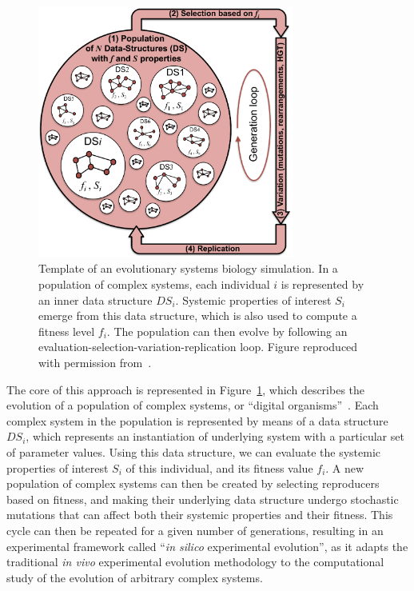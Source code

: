 \begin{figure}
\centering
\includegraphics[width=0.75\textwidth]{background/img/evol_sys_bio.pdf}
\caption[Template of an evolutionary systems biology simulation]{Template of an evolutionary systems biology simulation.
In a population of complex systems, each individual $i$ is represented by an inner data structure $DS_i$.
Systemic properties of interest $S_i$ emerge from this data structure, which is also used to compute a fitness level $f_i$.
The population can then evolve by following an evaluation-selection-variation-replication loop.
Figure reproduced with permission from~\citep{beslon2021}.}
\label{fig:background:evol-sys-bio}
\end{figure}

The core of this approach is represented in Figure~\ref{fig:background:evol-sys-bio}, which describes the evolution of a population of complex systems, or ``digital organisms''~\citep{adami2006}.
Each complex system in the population is represented by means of a data structure $DS_i$, which represents an instantiation of underlying system with a particular set of parameter values.
Using this data structure, we can evaluate the systemic properties of interest $S_i$ of this individual, and its fitness value $f_i$.
A new population of complex systems can then be created by selecting reproducers based on fitness, and making their underlying data structure undergo stochastic mutations that can affect both their systemic properties and their fitness.
This cycle can then be repeated for a given number of generations, resulting in an experimental framework called ``\emph{in silico} experimental evolution'', as it adapts the traditional \emph{in vivo} experimental evolution methodology to the computational study of the evolution of arbitrary complex systems.

